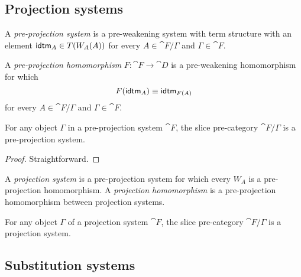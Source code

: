 \subsection{Projection systems}
\begin{defn}
A \emph{pre-projection system} is a pre-weakening system with term structure with an element
$\tfid{A}\in T(W_A(A))$ for every $A\in\cat{F}/\Gamma$ and $\Gamma\in\cat{F}$. 
\end{defn}

\begin{defn}
A \emph{pre-projection homomorphism} $F:\cat{F}\to\cat{D}$ is a pre-weakening homomorphism for which
\begin{equation*}
F(\tfid{A})\jdeq \tfid{F(A)}
\end{equation*}
for every $A\in\cat{F}/\Gamma$ and $\Gamma\in\cat{F}$.
\end{defn}

\begin{lem}
For any object $\Gamma$ in a pre-projection system $\cat{F}$, the slice pre-category
$\cat{F}/\Gamma$ is a pre-projection system.
\end{lem}

\begin{proof}
Straightforward.
\end{proof}

\begin{defn}
A \emph{projection system} is a pre-projection system for which every $W_A$ is
a pre-projection homomorphism. A \emph{projection homomorphism} is a pre-projection homomorphism
between projection systems.
\end{defn}

\begin{cor}
For any object $\Gamma$ of a projection system $\cat{F}$, the slice pre-category $\cat{F}/\Gamma$
is a projection system.
\end{cor}


\subsection{Substitution systems}

